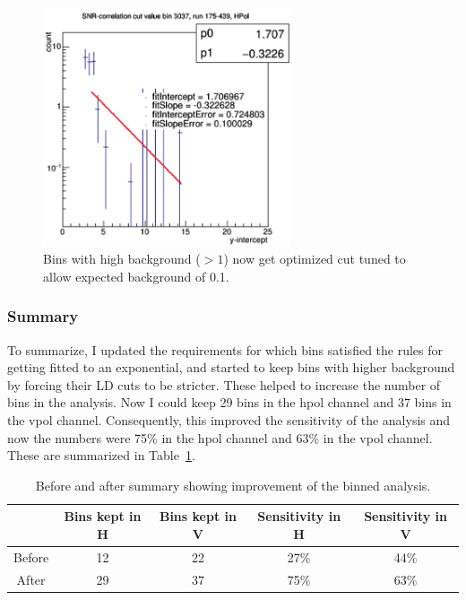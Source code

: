 \begin{figure}
\centering
\includegraphics[width=0.65\textwidth]{figures/high_bg_kept.png}
\caption{Bins with high background ($>1$) now get
optimized cut tuned to allow expected
background of 0.1.}
\label{high_bg_kept}
\end{figure}

\subsubsection{Summary}

To summarize, I updated the requirements for which bins satisfied the rules for getting fitted to an exponential, and started to keep bins with higher background by forcing their LD cuts to be stricter. These helped to increase the number of bins in the analysis. Now I could keep 29 bins in the \gls{hpol} channel and 37 bins in the \gls{vpol} channel. Consequently, this improved the sensitivity of the analysis and now the numbers were 75\% in the \gls{hpol} channel and 63\% in the \gls{vpol} channel. These are summarized in Table~\ref{improvement}. \\

\begin{table}
\centering
\begin{tabular}{ |c|c|c|c|c| } 
\hline
  & Bins kept in H  & Bins kept in V  & Sensitivity in H & Sensitivity in V \\ 
\hline
 Before & 12 & 22 & 27\% & 44\% \\ 
 After & 29 & 37 & 75\% & 63\% \\ 
\hline
\end{tabular}
\caption{Before and after summary showing improvement of the binned analysis.}
\label{improvement}
\end{table}



